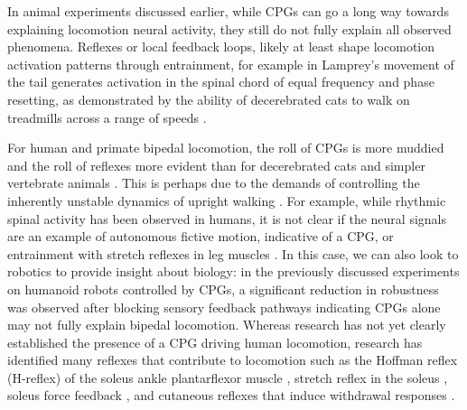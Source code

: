 In animal experiments discussed earlier, while CPGs can go a long way towards
explaining locomotion neural activity, they still do not fully explain all
observed phenomena. Reflexes or local feedback loops, likely at least shape
locomotion activation patterns through entrainment, for example in Lamprey's
movement of the tail generates activation in the spinal chord of equal frequency
\citep{mcclellan1993mechanosensory} and phase resetting, as demonstrated by the
ability of decerebrated cats to walk on treadmills across a range of speeds
\citep{rossignol2000locomotion}.

For human and primate bipedal locomotion, the roll of CPGs is more muddied and
the roll of reflexes more evident than for decerebrated cats and simpler
vertebrate animals \citep{mackay2002central, vaughan2003theories,
nielsen2003we}. This is perhaps due to the demands of controlling the inherently
unstable dynamics of upright walking \citep{capaday2002special}. For example,
while rhythmic spinal activity has been observed in humans, it is not clear if
the neural signals are an example of autonomous fictive motion, indicative of a
CPG, or entrainment with stretch reflexes in leg muscles
\citep{capaday2002special, stewart1991modulation}. In this case, we can also
look to robotics to provide insight about biology: in the previously discussed
experiments on humanoid robots controlled by CPGs, a significant reduction in
robustness was observed after blocking sensory feedback pathways
\citep{endo2005experimental, righetti2006programmable} indicating CPGs alone may
not fully explain bipedal locomotion. Whereas research has not yet clearly
established the presence of a CPG driving human locomotion, research has
identified many reflexes that contribute to locomotion such as the Hoffman
reflex (H-reflex) of the soleus ankle plantarflexor muscle
\citep{capaday1987difference}, stretch reflex in the soleus
\citep{yang1991contribution}, soleus force feedback \citep{grey2007positive},
and cutaneous reflexes that induce withdrawal responses \citep{yang1990phase}. 

